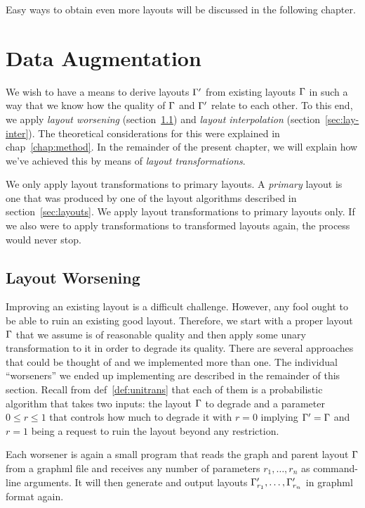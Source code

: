 \documentclass{graphstudy}
\begin{document}
Easy ways to obtain even more layouts will be discussed in the following chapter.

\chapter{Data Augmentation}
\label{chap:dataug}

We wish to have a means to derive layouts \(\Gamma'\) from existing layouts \(\Gamma\) in such a way that we know how
the quality of \(\Gamma\) and \(\Gamma'\) relate to each other.  To this end, we apply \emph{layout worsening}
(\acs{section}~\ref{sec:lay-worse}) and \emph{layout interpolation} (\acs{section}~\ref{sec:lay-inter}).  The
theoretical considerations for this were explained in \acl{chap}~\ref{chap:method}.  In the remainder of the present
chapter, we will explain how we've achieved this by means of \emph{layout transformations}.

We only apply layout transformations to primary layouts.  A \emph{primary} layout is one that was produced by one of the
layout algorithms described in \acl{section}~\ref{sec:layouts}.  We apply layout transformations to primary layouts
only.  If we also were to apply transformations to transformed layouts again, the process would never stop.

\section{Layout Worsening}
\label{sec:lay-worse}

Improving an existing layout is a difficult challenge.  However, any fool ought to be able to ruin an existing good
layout.  Therefore, we start with a proper layout \(\Gamma\) that we assume is of reasonable quality and then apply
some unary transformation to it in order to degrade its quality.  There are several approaches that could be thought of
and we implemented more than one.  The individual \enquote{worseners} we ended up implementing are described in the
remainder of this section.  Recall from \acl{def}~\ref{def:unitrans} that each of them is a probabilistic algorithm
that takes two inputs: the layout \(\Gamma\) to degrade and a parameter \(0\leq{r}\leq1\) that controls how much to
degrade it with \(r=0\) implying \(\Gamma'=\Gamma\) and \(r=1\) being a request to ruin the layout beyond any
restriction.

Each worsener is again a small program that reads the graph and parent layout \(\Gamma\) from a \ac{graphml} file and
receives any number of parameters \(r_1,\ldots,r_n\) as command-line arguments.  It will then generate and output
layouts \(\Gamma'_{r_1},\ldots,\Gamma'_{r_n}\) in \ac{graphml} format again.
\end{document}
